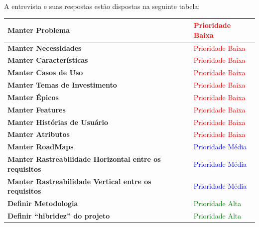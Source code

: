 A entrevista e suas respostas estão dispostas na seguinte tabela:

\begin{table}[H]
\centering
\begin{tabular}{|p{7cm}|p{3cm}|}
\hline
\textbf{Manter Problema} &
\textcolor{red}{Prioridade Baixa}
\\ \hline
\textbf{Manter Necessidades} &
\textcolor{red}{Prioridade Baixa}
\\ \hline
\textbf{Manter Características} &
\textcolor{red}{Prioridade Baixa}
\\ \hline
\textbf{Manter Casos de Uso} &
\textcolor{red}{Prioridade Baixa}
\\ \hline
\textbf{Manter Temas de Investimento} &
\textcolor{red}{Prioridade Baixa}
\\ \hline
\textbf{Manter Épicos} &
\textcolor{red}{Prioridade Baixa}
\\ \hline
\textbf{Manter Features} &
\textcolor{red}{Prioridade Baixa}
\\ \hline
\textbf{Manter Histórias de Usuário} &
\textcolor{red}{Prioridade Baixa}
\\ \hline
\textbf{Manter Atributos} &
\textcolor{red}{Prioridade Baixa}
\\ \hline
\textbf{Manter RoadMaps} &
\textcolor{blue}{Prioridade Média}
\\ \hline
\textbf{Manter Rastreabilidade Horizontal entre os requisitos} &
\textcolor{blue}{Prioridade Média}
\\ \hline
\textbf{Manter Rastreabilidade Vertical entre os requisitos} &
\textcolor{blue}{Prioridade Média}
\\ \hline
\textbf{Definir Metodologia} &
\textcolor{green}{Prioridade Alta}
\\ \hline
\textbf{Definir “hibridez” do projeto} &
\textcolor{green}{Prioridade Alta}
\\ \hline

\end{tabular}
\end{table}
